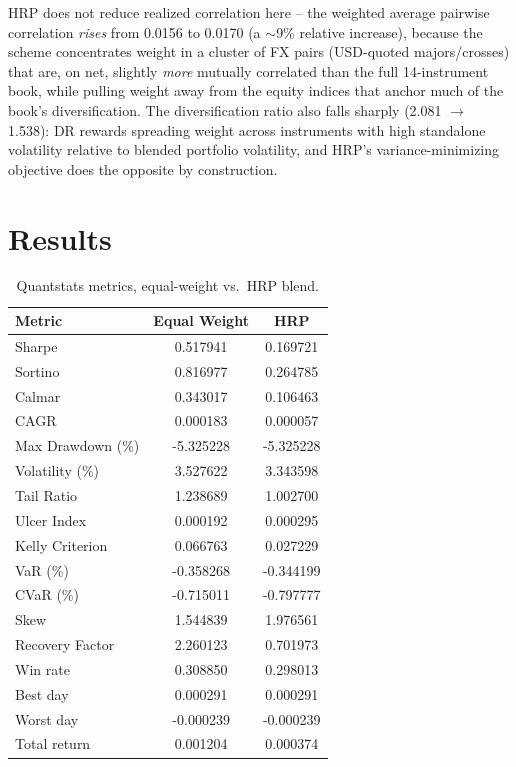 \documentclass[11pt]{article}
\begin{document}
HRP does not reduce realized correlation here -- the weighted average pairwise
correlation \emph{rises} from 0.0156 to 0.0170 (a $\sim$9\% relative increase), because
the scheme concentrates weight in a cluster of FX pairs (USD-quoted majors/crosses)
that are, on net, slightly \emph{more} mutually correlated than the full 14-instrument
book, while pulling weight away from the equity indices that anchor much of the
book's diversification. The diversification ratio also falls sharply (2.081 $\to$
1.538): DR rewards spreading weight across instruments with high standalone volatility
relative to blended portfolio volatility, and HRP's variance-minimizing objective
does the opposite by construction.

\section{Results}

\begin{table}[h]
\centering
\caption{Quantstats metrics, equal-weight vs.\ HRP blend.}
\begin{tabular}{lS[table-format=1.6]S[table-format=1.6]}
\toprule
Metric & {Equal Weight} & {HRP} \\
\midrule
Sharpe & 0.517941 & 0.169721 \\
Sortino & 0.816977 & 0.264785 \\
Calmar & 0.343017 & 0.106463 \\
CAGR & 0.000183 & 0.000057 \\
Max Drawdown (\%) & -5.325228 & -5.325228 \\
Volatility (\%) & 3.527622 & 3.343598 \\
Tail Ratio & 1.238689 & 1.002700 \\
Ulcer Index & 0.000192 & 0.000295 \\
Kelly Criterion & 0.066763 & 0.027229 \\
VaR (\%) & -0.358268 & -0.344199 \\
CVaR (\%) & -0.715011 & -0.797777 \\
Skew & 1.544839 & 1.976561 \\
Recovery Factor & 2.260123 & 0.701973 \\
\midrule
Win rate & 0.308850 & 0.298013 \\
Best day & 0.000291 & 0.000291 \\
Worst day & -0.000239 & -0.000239 \\
Total return & 0.001204 & 0.000374 \\
\bottomrule
\end{tabular}
\end{table}
\end{document}
